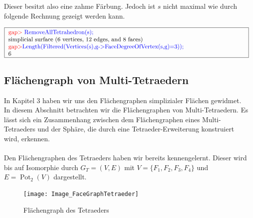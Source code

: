 \documentclass[12pt,titlepage,twoside,cleardoublepage]{article}
\theoremstyle{nummermitklammern}
\numberwithin{equation}{section}
\DeclareMathOperator{\Pot}{Pot}
\begin{document}
Dieser besitzt also eine zahme Färbung. Jedoch ist $s$ nicht maximal wie durch folgende Rechnung gezeigt werden kann.
\begin{center}
$\fbox{
\parbox{14cm}{
\textcolor{red}{gap$>$} \textcolor{blue}{RemoveAllTetrahedron(s);}\newline
simplicial surface (6 vertices, 12 edges, and 8 faces)\newline
\textcolor{red}{gap$>$}\textcolor{blue}{ Length(Filtered(Vertices(s),g-$>$FaceDegreeOfVertex(s,g)=3));}\newline
6
}}$
\end{center}
\subsection{Flächengraph von Multi-Tetraedern}\label{factet}
In Kapitel 3 haben wir uns den Flächengraphen simplizialer Flächen gewidmet. In diesem Abschnitt betrachten wir die Flächengraphen von Multi-Tetraedern. Es lässt sich ein Zusammenhang zwischen dem Flächengraphen eines Multi-Tetraeders und der Sphäre, die durch eine Tetraeder-Erweiterung konstruiert wird, erkennen.\\\\
Den Flächengraphen des Tetraeders haben wir bereits kennengelernt. Dieser wird bis auf Isomorphie durch $G_T=(V,E)$ mit $V=\{F_1,F_2,F_3,F_4\}$ und $E=\Pot_2(V)$ dargestellt.
\begin{figure}[H]
\begin{center}
\texttt{[image: Image\_FaceGraphTetraeder]}
\end{center}
\caption{Flächengraph des Tetraeders}
\end{figure}
\end{document}
